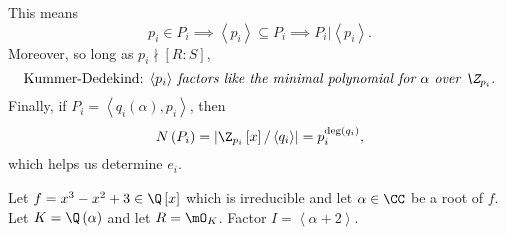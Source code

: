 \documentclass[pmath441]{subfiles}
\begin{document}
    This means
    \begin{equation*}
        p_i\in P_i \implies \left< p_i \right>\subseteq P_i \implies P_i|\left< p_i \right>.
    \end{equation*}
    Moreover, so long as $p_i\nmid\left[ R:S \right]$,
    \begin{equation*}
        \text{Kummer-Dedekind: \textit{$\left< p_i \right>$ factors like the minimal polynomial for $\alpha$ over $\Z_{p_i}$.}}
    \end{equation*}
    Finally, if $P_i = \left< q_i\left( \alpha \right),p_i \right>$, then
    \begin{equation*}
        N\left( P_i \right) = \left| \Z_{p_i}\left[ x \right] /\left< q_i \right>  \right| = p_i^{\deg\left( q_i \right)},
    \end{equation*}
    which helps us determine $e_i$.

    \clearpage

    \begin{example}{}
        Let $f=x^{3}-x^{2}+3\in\Q\left[ x \right]$ which is irreducible and let $\alpha\in\CC$ be a root of $f$. Let $K=\Q\left( \alpha \right)$ and let $R=\mO_K$. Factor $I = \left< \alpha+2 \right>$.
    \end{example}
\end{document}
